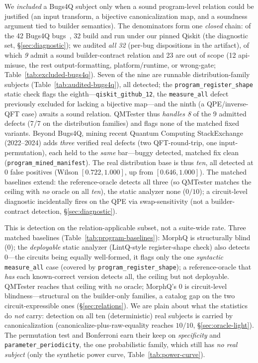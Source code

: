 We \emph{included} a Bugs4Q subject only when a sound program-level relation could be justified (an input transform, a bijective canonicalization map, and a soundness argument tied to builder semantics). The denominators form one \emph{closed} chain: of the 42 Bugs4Q bugs~\cite{miao2023bugs4q}, 32 build and run under our pinned Qiskit (the diagnostic set, \S\ref{sec:diagnostic}); we audited \emph{all 32} (per-bug dispositions in the artifact), of which \emph{9} admit a sound builder-contract relation and 23 are out of scope (12 api-misuse, the rest output-formatting, platform/runtime, or wrong-gate; Table~\ref{tab:excluded-bugs4q}). Seven of the nine are runnable distribution-family subjects (Table~\ref{tab:audited-bugs4q}), all detected; the \texttt{program\_register\_shape} static check flags the eighth---\texttt{qiskit\_github\_12}, the \texttt{measure\_all} defect previously excluded for lacking a bijective map---and the ninth (a QPE/inverse-QFT case) awaits a sound relation. QMTester thus \emph{handles 8} of the 9 admitted defects (7/7 on the distribution families) and flags none of the matched fixed variants. Beyond Bugs4Q, mining recent Quantum Computing StackExchange (2022--2024) adds \emph{three} verified real defects (two QFT-round-trip, one input-permutation), each held to the \emph{same} bar---buggy detected, matched fix clean (\texttt{program\_mined\_manifest}). The real distribution base is thus \emph{ten}, all detected at $0$ false positives (Wilson $[0.722,1.000]$, up from $[0.646,1.000]$). The matched baselines extend: the reference-oracle detects all three (so QMTester matches the ceiling with \emph{no} oracle on all \emph{ten}), the static analyzer none ($0/10$); a circuit-level diagnostic incidentally fires on the QPE via swap-sensitivity (not a builder-contract detection, \S\ref{sec:diagnostic}).




\noindent This is detection on the relation-applicable subset, not a suite-wide rate. Three matched baselines (Table~\ref{tab:program-baselines}): MorphQ is structurally blind ($0$); the \emph{deployable} static analyzer (LintQ-style register-shape check) also detects $0$---the circuits being equally well-formed, it flags only the one \emph{syntactic} \texttt{measure\_all} case (covered by \texttt{program\_register\_shape}); a reference-oracle that \emph{has} each known-correct version detects all, the ceiling but not deployable. QMTester reaches that ceiling with \emph{no} oracle; MorphQ's $0$ is circuit-level blindness---structural on the builder-only families, a catalog gap on the two circuit-expressible ones (\S\ref{sec:relations}). We are plain about what the statistics do \emph{not} carry: detection on all ten (deterministic) real subjects is carried by canonicalization (canonicalize-plus-raw-equality reaches $10/10$, \S\ref{sec:oracle-light}). The permutation test and Bonferroni earn their keep on \emph{specificity} and \texttt{parameter\_periodicity}, the one probabilistic family, which still has \emph{no real subject} (only the synthetic power curve, Table~\ref{tab:power-curve}).

